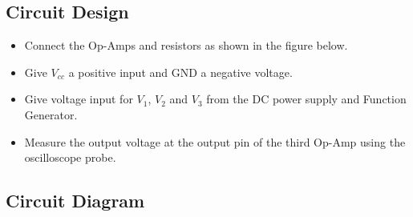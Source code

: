 \documentclass[a4paper,12pt]{article}
\begin{document}
\subsection{Circuit Design}
\begin{itemize}
    \item Connect the Op-Amps and resistors as shown in the figure below. 
    \item Give $V_{cc}$ a positive input and GND a negative voltage.
    \item Give voltage input for $V_1$, $V_2$ and $V_3$ from the DC power supply and Function Generator.
    \item Measure the output voltage at the output pin of the third Op-Amp using the oscilloscope probe. 
\end{itemize}
\subsection{Circuit Diagram}
\end{document}
